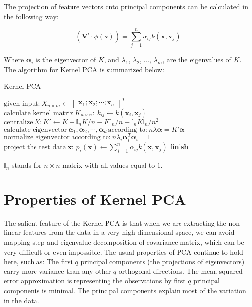 The projection of feature vectors onto principal components can be calculated in the following way:

\begin{equation}
(\pmb{V}^i \cdot \phi(\pmb{x})) = \sum_{j=1}^n \alpha_{ij} k(\mathbf{x}, \mathbf{x}_j)
\end{equation}

Where $\pmb{\alpha}_i$ is the eigenvector of $K$, and $\lambda_1$, $\lambda_2$, ...,  $\lambda_m$, are the eigenvalues of $K$.\\

The algorithm for Kernel PCA is summarized below:

\begin{algorithm}[H]
\caption{Kernel PCA}
\label{PCA}
\begin{algorithmic}[1]
	\State $\text{given input:} \  X_{n \times m} \leftarrow \begin{bmatrix} \mathbf{x}_1; \mathbf{x}_2; \cdots; \mathbf{x}_n \end{bmatrix}^T$
	\State $\text{calculate kernel matrix} \  K_{n \times n}: \  k_{ij} \leftarrow k(\mathbf{x}_i, \mathbf{x}_j)$
	\State $\text{centralize} \  K:  K' \leftarrow K - \mathbb{I}_nK/n - K\mathbb{I}_n/n + \mathbb{I}_nK\mathbb{I}_n/n^2$
	\State $\text{calculate eigenvector} \ \pmb{\alpha}_1, \pmb{\alpha}_2, \cdots, \pmb{\alpha}_d \   \text{according to:} \  n \lambda \pmb{\alpha} = K' \pmb{\alpha}$
	\State $\text{normalize eigenvector according to:} \  n \lambda_i \pmb{\alpha}_i^T \pmb{\alpha}_i = 1$
	\State $\text{project the test data} \  \mathbf{x}:  \  p_i(\mathbf{x}) \leftarrow \sum_{j=1}^n \alpha_{ij} k(\mathbf{x}, \mathbf{x}_j) $
\BState \bf finish
\EndProcedure
\end{algorithmic}
\end{algorithm}
 $\mathbb{I}_n$ stands for $n \times n$ matrix with all values equal to $1$.

\section{Properties of Kernel PCA}

The salient feature of the Kernel PCA is that when we are extracting the non-linear features from the data in a very high dimensional space,
we can avoid mapping step and eigenvalue decomposition of covariance matrix, which can be very difficult or even impossible. The usual properties of PCA continue to hold here, such as: The first $q$ principal components (the projections of eigenvectors) carry more variance than any other $q$ orthogonal directions.
The mean squared error approximation is representing the observations by first $q$ principal components is minimal. The principal components explain most of the variation in the data.

